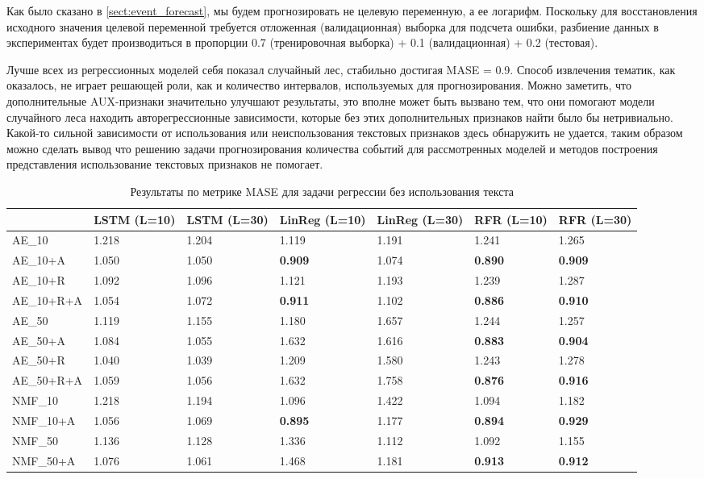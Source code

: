 Как было сказано в \ref{sect:event_forecast}, мы будем прогнозировать не целевую переменную, а ее логарифм. Поскольку для восстановления исходного значения целевой переменной требуется отложенная (валидационная) выборка для подсчета ошибки, разбиение данных в экспериментах будет производиться в пропорции 0.7 (тренировочная выборка) + 0.1 (валидационная) + 0.2 (тестовая). 

Лучше всех из регрессионных моделей себя показал случайный лес, стабильно достигая MASE = 0.9. Способ извлечения тематик, как оказалось, не играет решающей роли, как и количество интервалов, используемых для прогнозирования. Можно заметить, что дополнительные AUX-признаки значительно улучшают результаты, это вполне может быть вызвано тем, что они помогают модели случайного леса находить авторегрессионные зависимости, которые без этих дополнительных признаков найти было бы нетривиально. 
Какой-то сильной зависимости от использования или неиспользования текстовых признаков здесь обнаружить не удается, таким образом можно сделать вывод что решению задачи прогнозирования количества событий для рассмотренных моделей и методов построения представления использование текстовых признаков не помогает.
\begin{center}
\begin{table}
 \begin{tabular}{||p{3.8cm}|p{1.5cm}|p{1.5cm}|p{1.5cm}|p{1.5cm}|p{1.5cm}|p{1.5cm}||} 
\hline
& LSTM (L=10) & LSTM (L=30) & LinReg (L=10) & LinReg (L=30) & RFR (L=10) & RFR (L=30)\\ \hline\hline
AE\_10 & 1.218 & 1.204 & 1.119 & 1.191 & 1.241 & 1.265\\ \hline
AE\_10+A & 1.050 & 1.050 & \textbf{0.909} & 1.074 & \textbf{0.890} & \textbf{0.909}\\ \hline
AE\_10+R & 1.092 & 1.096 & 1.121 & 1.193 & 1.239 & 1.287\\ \hline
AE\_10+R+A & 1.054 & 1.072 & \textbf{0.911} & 1.102 & \textbf{0.886} & \textbf{0.910}\\ \hline
AE\_50 & 1.119 & 1.155 & 1.180 & 1.657 & 1.244 & 1.257\\ \hline
AE\_50+A & 1.084 & 1.055 & 1.632 & 1.616 & \textbf{0.883} & \textbf{0.904}\\ \hline
AE\_50+R & 1.040 & 1.039 & 1.209 & 1.580 & 1.243 & 1.278\\ \hline
AE\_50+R+A & 1.059 & 1.056 & 1.632 & 1.758 & \textbf{0.876} & \textbf{0.916}\\ \hline
NMF\_10 & 1.218 & 1.194 & 1.096 & 1.422 & 1.094 & 1.182\\ \hline
NMF\_10+A & 1.056 & 1.069 & \textbf{0.895} & 1.177 & \textbf{0.894} & \textbf{0.929}\\ \hline
NMF\_50 & 1.136 & 1.128 & 1.336 & 1.112 & 1.092 & 1.155\\ \hline
NMF\_50+A & 1.076 & 1.061 & 1.468 & 1.181 & \textbf{0.913} & \textbf{0.912}\\ \hline
  
\end{tabular}
\caption{\label{tab:reg-res-no-text} Результаты по метрике MASE для задачи регрессии без использования текста}
\end{table}
\end{center}

